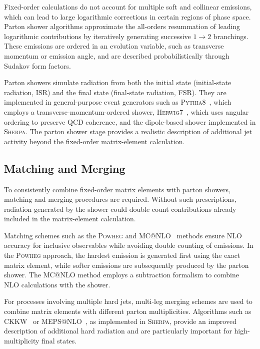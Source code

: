 Fixed-order calculations do not account for multiple soft and collinear emissions, which can lead to large logarithmic corrections in certain regions of phase space. 
Parton shower algorithms approximate the all-orders resummation of leading logarithmic contributions by iteratively generating successive $1 \to 2$ branchings. 
These emissions are ordered in an evolution variable, such as transverse momentum or emission angle, and are described probabilistically through Sudakov form factors.

Parton showers simulate radiation from both the initial state (initial-state radiation, ISR) and the final state (final-state radiation, FSR). 
They are implemented in general-purpose event generators such as \textsc{Pythia8}~\cite{Sjostrand2015Pythia82}, which employs a transverse-momentum-ordered shower, \textsc{Herwig7}~\cite{Bahr2008Herwigpp,Bellm2016Herwig70}, which uses angular ordering to preserve QCD coherence, and the dipole-based shower implemented in \textsc{Sherpa}. 
The parton shower stage provides a realistic description of additional jet activity beyond the fixed-order matrix-element calculation.

\subsection*{Matching and Merging}

To consistently combine fixed-order matrix elements with parton showers, matching and merging procedures are required. 
Without such prescriptions, radiation generated by the shower could double count contributions already included in the matrix-element calculation.

Matching schemes such as the \textsc{Powheg} and \textsc{MC@NLO}~\cite{Frixione2002MCatNLO} methods ensure NLO accuracy for inclusive observables while avoiding double counting of emissions. 
In the \textsc{Powheg} approach, the hardest emission is generated first using the exact matrix element, while softer emissions are subsequently produced by the parton shower. 
The \textsc{MC@NLO} method employs a subtraction formalism to combine NLO calculations with the shower.

For processes involving multiple hard jets, multi-leg merging schemes are used to combine matrix elements with different parton multiplicities. 
Algorithms such as CKKW~\cite{Catani2001CKKW} or MEPS@NLO~\cite{Hoeche2012NLOPSMatching,Schumann2008DipoleShower,Catani2001CKKW}, as implemented in \textsc{Sherpa}, provide an improved description of additional hard radiation and are particularly important for high-multiplicity final states.

